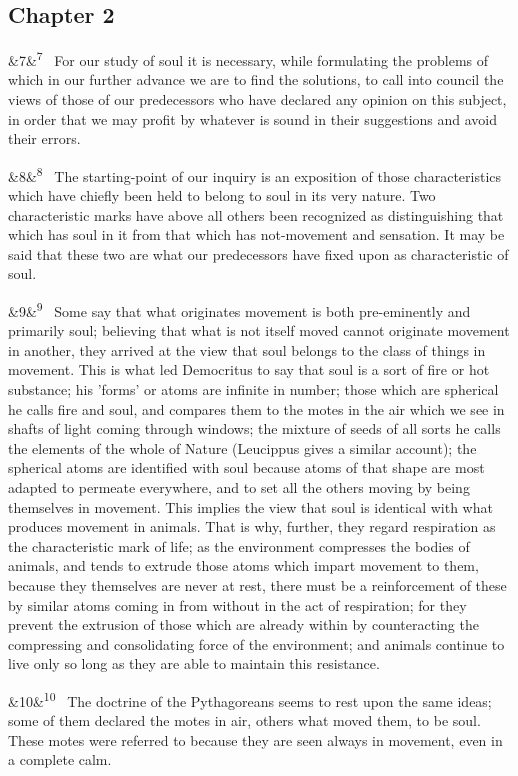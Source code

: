 \documentclass[12pt]{article}
\newcommand{\para}[1][]{\par\noindent\ifx&#1&\else\textsuperscript{\footnotesize #1}~\fi}
\begin{document}
\subsection*{Chapter 2}

\para[7] For our study of soul it is necessary, while formulating the problems of which in our further advance we are to find the solutions, to call into council the views of those of our predecessors who have declared any opinion on this subject, in order that we may profit by whatever is sound in their suggestions and avoid their errors.

\para[8] The starting-point of our inquiry is an exposition of those characteristics which have chiefly been held to belong to soul in its very nature. Two characteristic marks have above all others been recognized as distinguishing that which has soul in it from that which has not-movement and sensation. It may be said that these two are what our predecessors have fixed upon as characteristic of soul.

\para[9] Some say that what originates movement is both pre-eminently and primarily soul; believing that what is not itself moved cannot originate movement in another, they arrived at the view that soul belongs to the class of things in movement. This is what led Democritus to say that soul is a sort of fire or hot substance; his 'forms' or atoms are infinite in number; those which are spherical he calls fire and soul, and compares them to the motes in the air which we see in shafts of light coming through windows; the mixture of seeds of all sorts he calls the elements of the whole of Nature (Leucippus gives a similar account); the spherical atoms are identified with soul because atoms of that shape are most adapted to permeate everywhere, and to set all the others moving by being themselves in movement. This implies the view that soul is identical with what produces movement in animals. That is why, further, they regard respiration as the characteristic mark of life; as the environment compresses the bodies of animals, and tends to extrude those atoms which impart movement to them, because they themselves are never at rest, there must be a reinforcement of these by similar atoms coming in from without in the act of respiration; for they prevent the extrusion of those which are already within by counteracting the compressing and consolidating force of the environment; and animals continue to live only so long as they are able to maintain this resistance.

\para[10] The doctrine of the Pythagoreans seems to rest upon the same ideas; some of them declared the motes in air, others what moved them, to be soul. These motes were referred to because they are seen always in movement, even in a complete calm.
\end{document}
